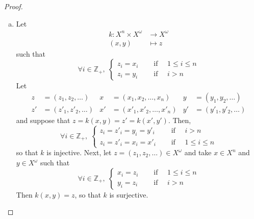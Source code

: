 \documentclass[11pt,a4paper,twoside]{article}
\theoremstyle{definition}
\begin{document}
\begin{proof}
\begin{enumerate}[(a)]
  \item Let
    \begin{align*}
      k : X^n \times X^\omega &\to X^\omega \\
      (x, y) &\mapsto z
    \end{align*}
    such that
    \begin{equation*}
      \forall i \in \mathbb{Z}_+, \; \begin{cases}
        z_i = x_i &\quad\text{ if }\quad 1 \leq i \leq n \\
        z_i = y_i &\quad\text{ if }\quad i > n
      \end{cases}
    \end{equation*}
    Let
    \begin{align*}
      z &= (z_1, z_2, \dotsc) & x &= (x_1, x_2, \dotsc, x_n) & y &= (y_1, y_2, \dotsc) \\
      z' &= (z'_1, z'_2, \dotsc) & x' &= (x'_1, x'_2, \dotsc, x'_n) & y' &= (y'_1, y'_2, \dotsc)
    \end{align*}
    and suppose that $z = k (x, y) = z' = k (x', y')$. Then,
    \begin{equation*}
      \forall i \in \mathbb{Z}_+, \; \begin{cases}
        z_i = z'_i = y_i = y'_i &\quad\text{ if }\quad i > n \\
        z_i = z'_i = x_i = x'_i &\quad\text{ if }\quad 1 \leq i \leq n
      \end{cases}
    \end{equation*}
    so that $k$ is injective.
    Next, let $z = (z_1, z_2, \dotsc) \in X^\omega$ and take $x \in X^n$ and $y \in X^\omega$ such that
    \begin{equation*}
      \forall i \in \mathbb{Z}_+, \; \begin{cases}
        x_i = z_i &\quad\text{ if }\quad 1 \leq i \leq n \\
        y_i = z_i &\quad\text{ if }\quad i > n
      \end{cases}
    \end{equation*}
    Then $k (x, y) = z$, so that $k$ is surjective.


\end{enumerate}
\end{proof}
\end{document}
